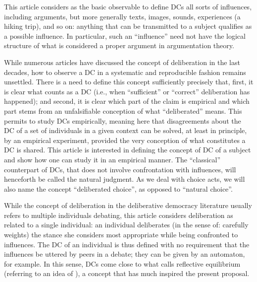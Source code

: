 \documentclass[version=last, pagesize, twoside=off, bibliography=totoc, fontsize=12pt, a4paper, french, english]{scrartcl}
\begin{document}
This article considers as the basic observable to define \acp{DC} all sorts of influences, including arguments, but more generally texts, images, sounds, experiences (a hiking trip), and so on: anything that can be transmitted to a subject qualifies as a possible influence. In particular, such an “influence” need not have the logical structure of what is considered a proper argument in argumentation theory.

While numerous articles have discussed the concept of deliberation in the last decades, how to observe a \ac{DC} in a systematic and reproducible fashion remains unsettled. There is a need to define this concept sufficiently precisely that, first, it is clear what counts as a \ac{DC} (i.e., when “sufficient” \citep{meinard_justification_2020} or “correct” deliberation has happened); and second, it is clear which part of the claim is empirical and which part stems from an unfalsifiable conception of what “deliberated” means. This permits to study \acp{DC} empirically, meaning here that disagreements about the \ac{DC} of a set of individuals in a given context can be solved, at least in principle, by an empirical experiment, provided the very conception of what constitutes a \ac{DC} is shared. This article is interested in defining the concept of \ac{DC} of a subject and show how one can study it in an empirical manner. The “classical” counterpart of \acp{DC}, that does not involve confrontation with influences, will henceforth be called the natural judgment. As we deal with choice acts, we will also name the concept “deliberated choice”, as opposed to “natural choice”.

While the concept of deliberation in the deliberative democracy literature usually refers to multiple individuals debating, this article considers deliberation as related to a single individual: an individual deliberates (in the sense of: carefully weights) the stance she considers most appropriate while being confronted to influences. The \ac{DC} of an individual is thus defined with no requirement that the influences be uttered by peers in a debate; they can be given by an automaton, for example. In this sense, \acp{DC} come close to what \citet{rawls_theory_1999} calls reflective equilibrium (referring to an idea of \citet{goodman_fact_1983}), a concept that has much inspired the present proposal.
\end{document}

